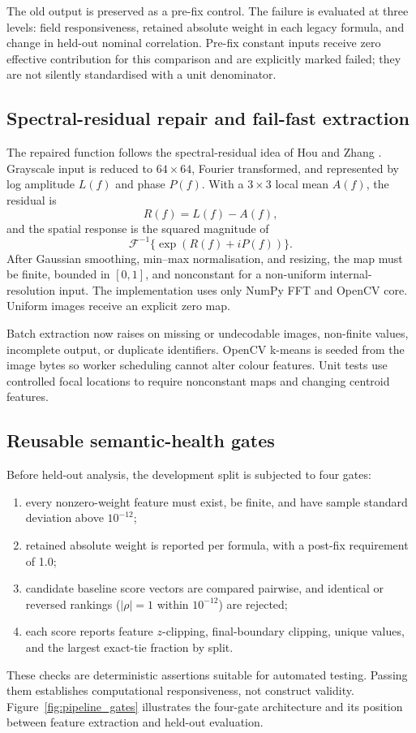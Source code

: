 The old output is preserved as a pre-fix control. The failure is evaluated at three levels: field responsiveness, retained absolute weight in each legacy formula, and change in held-out nominal correlation. Pre-fix constant inputs receive zero effective contribution for this comparison and are explicitly marked failed; they are not silently standardised with a unit denominator.

\subsection{Spectral-residual repair and fail-fast extraction}

The repaired function follows the spectral-residual idea of Hou and Zhang \citep{hou2007spectral}. Grayscale input is reduced to $64\times64$, Fourier transformed, and represented by log amplitude $L(f)$ and phase $P(f)$. With a $3\times3$ local mean $A(f)$, the residual is
\begin{equation}
R(f)=L(f)-A(f),
\end{equation}
and the spatial response is the squared magnitude of
\begin{equation}
\mathcal{F}^{-1}\{\exp(R(f)+iP(f))\}.
\end{equation}
After Gaussian smoothing, min--max normalisation, and resizing, the map must be finite, bounded in $[0,1]$, and nonconstant for a non-uniform internal-resolution input. The implementation uses only NumPy FFT and OpenCV core. Uniform images receive an explicit zero map.

Batch extraction now raises on missing or undecodable images, non-finite values, incomplete output, or duplicate identifiers. OpenCV k-means is seeded from the image bytes so worker scheduling cannot alter colour features. Unit tests use controlled focal locations to require nonconstant maps and changing centroid features.

\subsection{Reusable semantic-health gates}

Before held-out analysis, the development split is subjected to four gates:
\begin{enumerate}
    \item every nonzero-weight feature must exist, be finite, and have sample standard deviation above $10^{-12}$;
    \item retained absolute weight is reported per formula, with a post-fix requirement of 1.0;
    \item candidate baseline score vectors are compared pairwise, and identical or reversed rankings ($|\rho|=1$ within $10^{-12}$) are rejected;
    \item each score reports feature $z$-clipping, final-boundary clipping, unique values, and the largest exact-tie fraction by split.
\end{enumerate}
These checks are deterministic assertions suitable for automated testing. Passing them establishes computational responsiveness, not construct validity. Figure~\ref{fig:pipeline_gates} illustrates the four-gate architecture and its position between feature extraction and held-out evaluation.

